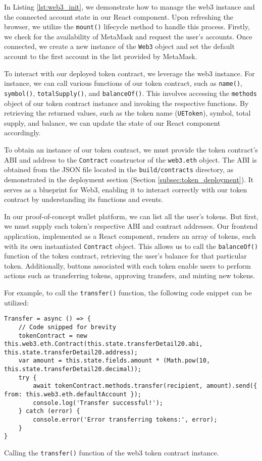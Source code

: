 In Listing \ref{lst:web3_init}, we demonstrate how to manage the web3 instance and the connected account state in our React component. Upon
refreshing the browser, we utilize the \texttt{mount()} lifecycle method to handle this process. Firstly, we check for the availability
of MetaMask and request the user's accounts. Once connected, we create a new instance of the \texttt{Web3} object and set the default account to the first account in the list provided by MetaMask.


To interact with our deployed token contract, we leverage the web3 instance. For instance, we can call various functions of our token contract, such as
\texttt{name()}, \texttt{symbol()}, \texttt{totalSupply()}, and \texttt{balanceOf()}. This involves accessing the \texttt{methods} object of our
token contract instance and invoking the respective functions. By retrieving the returned values, such as the token name (\texttt{UEToken}), symbol,
total supply, and balance, we can update the state of our React component accordingly.


To obtain an instance of our token contract, we must provide the token contract's ABI and address to the \texttt{Contract} constructor of the
\texttt{web3.eth} object. The ABI is obtained from the JSON file located in the \texttt{build/contracts} directory, as demonstrated in the
deployment section (Section \ref{subsec:token_deployment}). It serves as a blueprint for Web3, enabling it to interact correctly with our token
contract by understanding its functions and events.




In our proof-of-concept wallet platform, we can list all the user's tokens. But first, we must supply each token's respective ABI and
contract addresses. Our frontend application, implemented as a React component, renders an array of tokens, each with its own
instantiated \texttt{Contract} object. This allows us to call the \texttt{balanceOf()} function of the token contract, retrieving the user's
balance for that particular token. Additionally, buttons associated with each token enable users to perform actions such as transferring tokens,
approving transfers, and minting new tokens.


For example, to call the \texttt{transfer()} function, the following code snippet can be utilized:


\begin{listing}[H]
    \begin{verbatim}
Transfer = async () => {
    // Code snipped for brevity
    tokenContract = new this.web3.eth.Contract(this.state.transferDetail20.abi, this.state.transferDetail20.address);
    var amount = this.state.fields.amount * (Math.pow(10, this.state.transferDetail20.decimal));
    try {
        await tokenContract.methods.transfer(recipient, amount).send({ from: this.web3.eth.defaultAccount });
        console.log('Transfer successful!');
    } catch (error) {
        console.error('Error transferring tokens:', error);
    }
}
    \end{verbatim}
    \caption{Calling the \texttt{transfer()} function of the web3 token contract instance.}
    \label{lst:transfer}
\end{listing}


